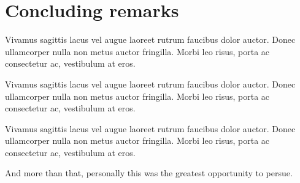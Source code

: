 \clearpage
\chapter{Concluding remarks}
\label{ch:conclusion}

Vivamus sagittis lacus vel augue laoreet rutrum faucibus dolor auctor. Donec ullamcorper nulla non metus auctor fringilla. Morbi leo risus, porta ac consectetur ac, vestibulum at eros.

Vivamus sagittis lacus vel augue laoreet rutrum faucibus dolor auctor. Donec ullamcorper nulla non metus auctor fringilla. Morbi leo risus, porta ac consectetur ac, vestibulum at eros.

Vivamus sagittis lacus vel augue laoreet rutrum faucibus dolor auctor. Donec ullamcorper nulla non metus auctor fringilla. Morbi leo risus, porta ac consectetur ac, vestibulum at eros.

And more than that, personally this was the greatest opportunity to persue.

